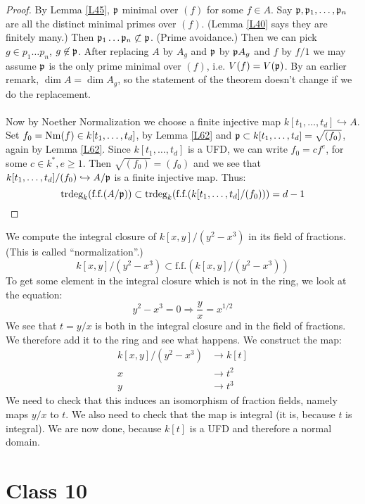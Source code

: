 \documentclass{../mathnotes}
\begin{document}
\begin{proof}
By Lemma \ref{L45}, $\mathfrak p$ minimal over $(f)$ for some $f\in A$. Say $\mathfrak p, \mathfrak p_1, \dots, \mathfrak p_n$ are all the distinct minimal primes over $(f)$. (Lemma \ref{L40} says they are finitely many.) Then $\mathfrak p_1 \dots \mathfrak p_n \not \subset \mathfrak p$. (Prime avoidance.) Then we can pick $g\in p_1 \dots p_n$, $g\not \in \mathfrak p$. After replacing $A$ by $A_g$ and $\mathfrak p$ by $\mathfrak p A_g$ and $f$ by $f/1$ we may assume $\mathfrak p$ is the only prime minimal over $(f)$, i.e. $V(f) = V(\mathfrak p)$. By an earlier remark, $\dim A = \dim A_g$, so the statement of the theorem doesn't change if we do the replacement. 
\\
\\
Now by Noether Normalization we choose a finite injective map $k[t_1, \dots, t_d] \hookrightarrow A$. Set $f_0 = \operatorname{Nm}(f) \in k[t_1, \dots, t_d]$, by Lemma \ref{L62} and $\mathfrak p \subset k[t_1, \dots, t_d] = \sqrt{(f_0)}$, again by Lemma \ref{L62}. Since $k[t_1, \dots, t_d]$ is a UFD, we can write $f_0 = cf^e$, for some $c\in k^*, e\geq 1$. Then $\sqrt{(f_0)} = (f_0)$ and we see that $k[t_1, \dots, t_d]/(f_0) \hookrightarrow A/\mathfrak p$ is a finite injective map. Thus:
\[       \text{trdeg}_k (\text{f.f.} (A/\mathfrak p)) \subset \text{trdeg}_k (\text{f.f.} (k[t_1, \dots, t_d]/(f_0))) = d-1    \]
\end{proof}

\begin{exmp}
We compute the integral closure of $k[x,y]/(y^2 - x^3)$ in its field of fractions. (This is called ``normalization''.)
\[       k[x,y]/(y^2 - x^3) \subset \text{f.f.} (k[x,y]/(y^2 - x^3))    \]
To get some element in the integral closure which is not in the ring, we look at the equation:
\[       y^2 - x^3 = 0 \Rightarrow \frac{y}{x} = x^{1/2}    \]
We see that $t = y/x$ is both in the integral closure and in the field of fractions. We therefore add it to the ring and see what happens. We construct the map:
\begin{align*}      k[x,y]/(y^2 - x^3) &\to k[t] \\
x &\to t^2 \\
y &\to t^3
\end{align*}
We need to check that this induces an isomorphism of fraction fields, namely maps $y/x$ to $t$. We also need to check that the map is integral (it is, because $t$ is integral). We are now done, because $k[t]$ is a UFD and therefore a normal domain.
\end{exmp}

\section*{Class 10}
\end{document}

